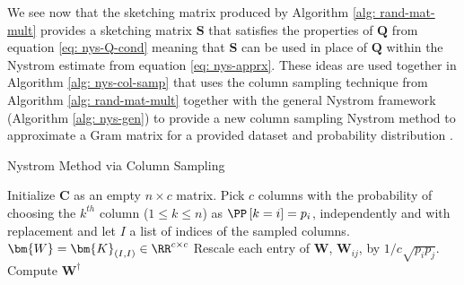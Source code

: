 We see now that the sketching matrix produced by Algorithm \ref{alg: rand-mat-mult} provides a sketching matrix $\bm{S}$ that satisfies the properties of $\bm{Q}$ from equation \ref{eq: nys-Q-cond} meaning that $\bm{S}$ can be used in place of $\bm{Q}$ within the Nystrom estimate from equation \ref{eq: nys-apprx}. These ideas are used together in Algorithm \ref{alg: nys-col-samp} that uses the column sampling technique from Algorithm \ref{alg: rand-mat-mult} together with the general Nystrom framework (Algorithm \ref{alg: nys-gen}) to provide a new column sampling Nystrom method to approximate a Gram matrix for a provided dataset and probability distribution \cites{JMLR:v6:drineas05a,DBLP:journals/corr/abs-1303-1849}.

{\centering
\begin{minipage}{.85\linewidth}
    \begin{algorithm}[H]
        \caption{Nystrom Method via Column Sampling}
        \label{alg: nys-col-samp}
        \SetAlgoLined
        \DontPrintSemicolon

        \BlankLine
        Initialize $\bm{C}$ as an empty $n \times c$ matrix.\;
        Pick $c$ columns with the probability of choosing the $k^{th}$ column ($1 \leq k \leq n$) as $\PP \left[ k = i \right] = p_i$, independently and with replacement and let $I$ a list of indices of the sampled columns.\;
        $\bm{W} = \bm{K}_{(I,I)} \in \RR^{c \times c}$\;
        Rescale each entry of $\bm{W}$, $\bm{W}_{ij}$, by $1 / c \sqrt{p_i p_j}$.\;
        Compute $\bm{W}^{\dagger}$\;
        \BlankLine
    \end{algorithm}
\end{minipage}
\par}

